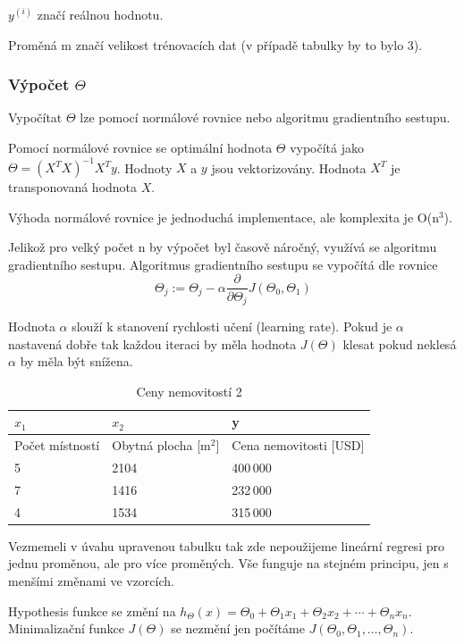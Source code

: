$y^{(i)}$ značí reálnou hodnotu.

Proměná m značí velikost trénovacích dat (v případě tabulky by to bylo 3).

\subsubsection{Výpočet $\Theta$}
Vypočítat $\Theta$ lze pomocí normálové rovnice nebo algoritmu gradientního sestupu.

Pomocí normálové rovnice se optimální hodnota $\Theta$ vypočítá jako $\Theta = (X^TX)^{-1}X^Ty$.
Hodnoty $X$ a $y$ jsou vektorizovány.
Hodnota $X^T$ je transponovaná hodnota $X$.

Výhoda normálové rovnice je jednoduchá implementace, ale komplexita je O($\text{n}^3$).

Jelikož pro velký počet n by výpočet byl časově náročný, využívá se algoritmu gradientního sestupu.
Algoritmus gradientního sestupu se vypočítá dle rovnice 
\[\Theta_j := \Theta_j - \alpha \frac{\partial}{\partial\Theta_j}J(\Theta_0,\Theta_1)\]

Hodnota $\alpha$ slouží k stanovení rychlosti učení (learning rate).
Pokud je $\alpha$ nastavená dobře tak každou iteraci by měla hodnota $J(\Theta)$ klesat pokud neklesá $\alpha$ by měla být snížena.


\begin{table}[h]
	\centering
	\begin{tabular}{ |p{4.5cm}|p{4.5cm}||p{4.5cm}| }
	\hline
    $x_1$ & $x_2$ & y \\ \hline
    Počet místností & Obytná plocha [$\text{m}^2$] & Cena nemovitosti [USD]\\ \hline
    5 & 2104 & 400\,000 \\ \hline
    7 & 1416 & 232\,000 \\ \hline
    4 & 1534 & 315\,000 \\ \hline
	\end{tabular}
	\caption{Ceny nemovitostí 2}
\end{table}

Vezmemeli v úvahu upravenou tabulku tak zde nepoužijeme lineární regresi pro jednu proměnou, ale pro více proměných.
Vše funguje na stejném principu, jen s menšími změnami ve vzorcích.

Hypothesis funkce se změní na $h_{\Theta}(x) = \Theta_0 + \Theta_1 x_1 + \Theta_2 x_2 + \dotsb + \Theta_n x_n$.
Minimalizační funkce $J(\Theta)$ se nezmění jen počítáme $J(\Theta_0, \Theta_1, \dots , \Theta_n)$.

